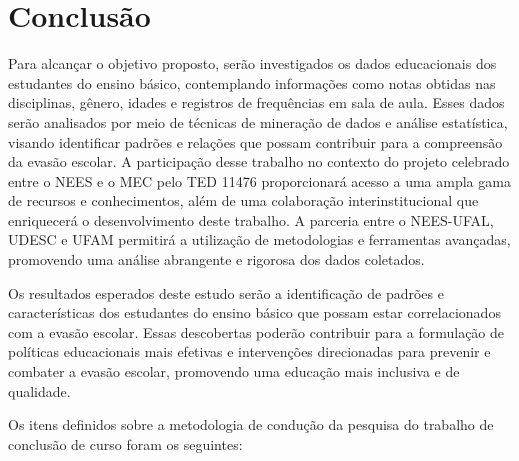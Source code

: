

\section{Conclusão}

Para alcançar o objetivo proposto, serão investigados os dados educacionais dos estudantes do ensino básico, contemplando informações como notas obtidas nas disciplinas, gênero, idades e registros de frequências em sala de aula. Esses dados serão analisados por meio de técnicas de mineração de dados e análise estatística, visando identificar padrões e relações que possam contribuir para a compreensão da evasão escolar. A participação desse trabalho no contexto do projeto celebrado entre o NEES e o MEC pelo TED 11476 proporcionará acesso a uma ampla gama de recursos e conhecimentos, além de uma colaboração interinstitucional que enriquecerá o desenvolvimento deste trabalho. A parceria entre o NEES-UFAL, UDESC e UFAM permitirá a utilização de metodologias e ferramentas avançadas, promovendo uma análise abrangente e rigorosa dos dados coletados.

Os resultados esperados deste estudo serão a identificação de padrões e características dos estudantes do ensino básico que possam estar correlacionados com a evasão escolar. Essas descobertas poderão contribuir para a formulação de políticas educacionais mais efetivas e intervenções direcionadas para prevenir e combater a evasão escolar, promovendo uma educação mais inclusiva e de qualidade.

Os itens definidos sobre a metodologia de condução da pesquisa do trabalho de conclusão de curso foram os seguintes:


